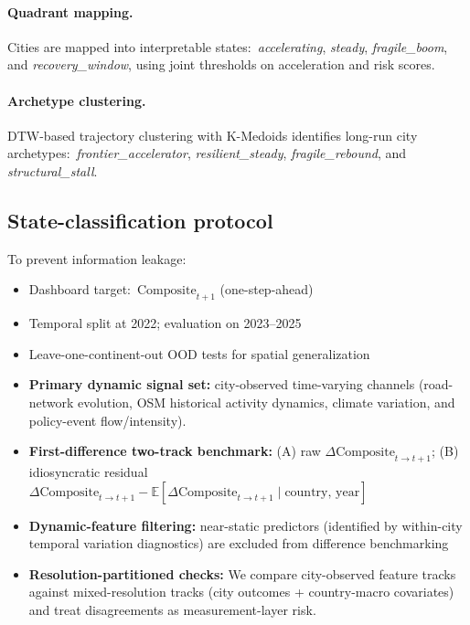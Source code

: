 \documentclass[11pt,a4paper]{article}
\newcommand{\Composite}{\text{Composite}}
\begin{document}
\paragraph{Quadrant mapping.} Cities are mapped into interpretable states:\ \emph{accelerating}, \emph{steady}, \emph{fragile\_boom}, and \emph{recovery\_window}, using joint thresholds on acceleration and risk scores.

\paragraph{Archetype clustering.} DTW-based trajectory clustering with K-Medoids identifies long-run city archetypes:\ \emph{frontier\_accelerator}, \emph{resilient\_steady}, \emph{fragile\_rebound}, and \emph{structural\_stall}.

\subsection{State-classification protocol}
To prevent information leakage:
\begin{itemize}
  \item Dashboard target:\ $\Composite_{t+1}$ (one-step-ahead)
  \item Temporal split at 2022; evaluation on 2023--2025
  \item Leave-one-continent-out OOD tests for spatial generalization
  \item \textbf{Primary dynamic signal set:} city-observed time-varying channels (road-network evolution, OSM historical activity dynamics, climate variation, and policy-event flow/intensity).
  \item \textbf{First-difference two-track benchmark:} (A) raw $\Delta \Composite_{t \to t+1}$; (B) idiosyncratic residual $\Delta \Composite_{t \to t+1} - \mathbb{E}[\Delta \Composite_{t \to t+1}\mid\text{country, year}]$
  \item \textbf{Dynamic-feature filtering:} near-static predictors (identified by within-city temporal variation diagnostics) are excluded from difference benchmarking
  \item \textbf{Resolution-partitioned checks:} We compare city-observed feature tracks against mixed-resolution tracks (city outcomes + country-macro covariates) and treat disagreements as measurement-layer risk.
\end{itemize}
\end{document}
